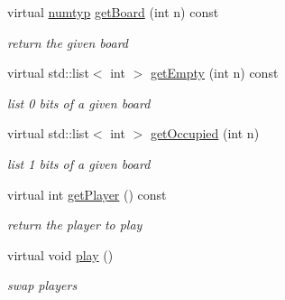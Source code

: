 \begin{DoxyCompactItemize}
\item 
virtual \hyperlink{_bitboard_8h_a4cb9c9bca464b161b17040f5bc4b3db9}{numtyp} \hyperlink{class_bitboard_a4d75c6baadfb64ab2a0d39d4256ecd81}{get\+Board} (int n) const 
\begin{DoxyCompactList}\small\item\em return the given board \end{DoxyCompactList}\item 
virtual std\+::list$<$ int $>$ \hyperlink{class_bitboard_add99aaac08d1926daf8836165cbba82e}{get\+Empty} (int n) const 
\begin{DoxyCompactList}\small\item\em list 0 bits of a given board \end{DoxyCompactList}\item 
virtual std\+::list$<$ int $>$ \hyperlink{class_bitboard_af334925201c192ed13760fab4341bceb}{get\+Occupied} (int n)
\begin{DoxyCompactList}\small\item\em list 1 bits of a given board \end{DoxyCompactList}\item 
virtual int \hyperlink{class_bitboard_a93c3e91c8bce5425b171bfd698cad6dd}{get\+Player} () const 
\begin{DoxyCompactList}\small\item\em return the player to play \end{DoxyCompactList}\item 
\hypertarget{class_bitboard_a06f70ece7a8e4e308c7a97136d186f6c}{virtual void \hyperlink{class_bitboard_a06f70ece7a8e4e308c7a97136d186f6c}{play} ()}\label{class_bitboard_a06f70ece7a8e4e308c7a97136d186f6c}

\begin{DoxyCompactList}\small\item\em swap players \end{DoxyCompactList}\end{DoxyCompactItemize}
